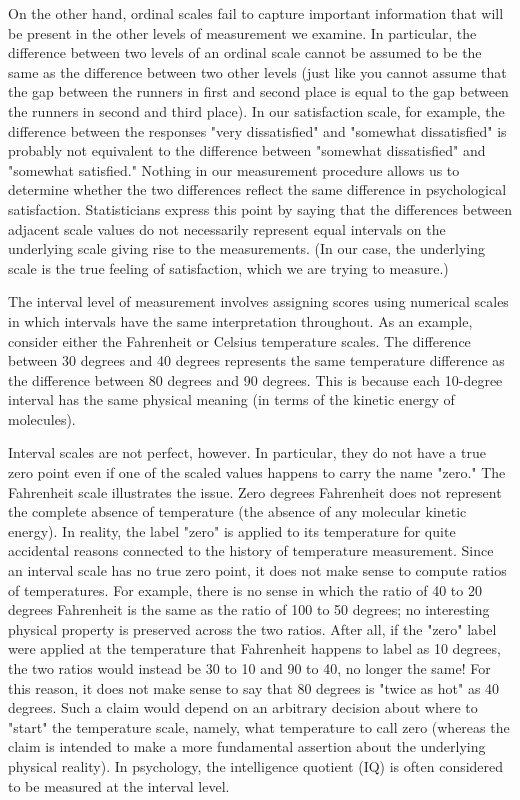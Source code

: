 On the other hand, ordinal scales fail to capture important information that will be present in the other levels of measurement we examine. In particular, the difference between two levels of an ordinal scale cannot be assumed to be the same as the difference between two other levels (just like you cannot assume that the gap between the runners in first and second place is equal to the gap between the runners in second and third place). In our
satisfaction scale, for example, the difference between the responses "very dissatisfied" and "somewhat dissatisfied" is probably not equivalent to the difference between "somewhat dissatisfied" and "somewhat satisfied." Nothing in our measurement procedure allows us to determine whether the two differences reflect the same difference in psychological satisfaction. Statisticians express this point by saying that the differences between adjacent scale values do not necessarily represent equal intervals on the underlying scale giving rise to the measurements. (In our case, the underlying scale is the true feeling of satisfaction, which we are trying to measure.)

The interval level of measurement involves assigning scores using numerical scales in which intervals have the same interpretation throughout. As an example, consider either the Fahrenheit or Celsius temperature scales. The difference between 30 degrees and 40 degrees represents the same temperature difference as the difference between 80 degrees and 90 degrees. This is because each 10-degree interval has the same physical meaning (in terms of the kinetic energy of molecules).

Interval scales are not perfect, however. In particular, they do not have a true zero point even if one of the scaled values happens to carry the name "zero." The Fahrenheit scale illustrates the issue. Zero degrees Fahrenheit does not represent the complete absence of temperature (the absence of any molecular kinetic energy). In reality, the label "zero" is applied to its temperature for quite accidental reasons connected to the history of temperature measurement. Since an interval scale has no true zero point, it does not make sense to compute ratios of temperatures. For example, there is no sense in which the ratio of 40 to 20 degrees Fahrenheit is the same as the ratio of 100 to 50 degrees; no interesting physical property is preserved across the two ratios. After all, if the "zero" label were applied at the temperature that Fahrenheit happens to label as 10 degrees, the two ratios would instead be 30 to 10 and 90 to 40, no longer the same! For this reason, it does not make sense to say that 80 degrees is "twice as hot" as 40 degrees. Such a claim would depend on an arbitrary decision about where to "start" the temperature scale, namely, what temperature to call zero (whereas the claim is intended to make a more fundamental assertion about the underlying physical reality). In psychology, the intelligence quotient (IQ) is often considered to be measured at the interval level.

